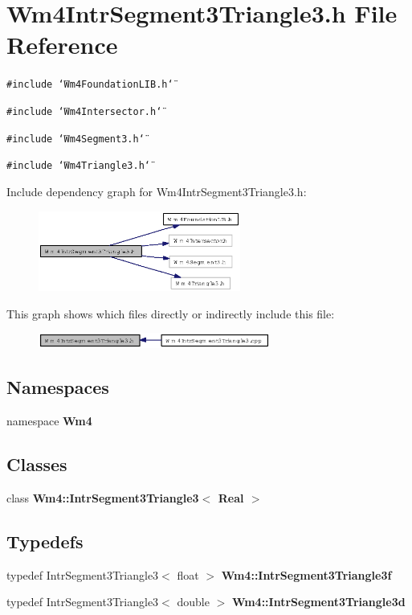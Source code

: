 \section{Wm4Intr\-Segment3Triangle3.h File Reference}
\label{Wm4IntrSegment3Triangle3_8h}
{\tt \#include \char`\"{}Wm4Foundation\-LIB.h\char`\"{}}\par
{\tt \#include \char`\"{}Wm4Intersector.h\char`\"{}}\par
{\tt \#include \char`\"{}Wm4Segment3.h\char`\"{}}\par
{\tt \#include \char`\"{}Wm4Triangle3.h\char`\"{}}\par


Include dependency graph for Wm4Intr\-Segment3Triangle3.h:\begin{figure}[H]
\begin{center}
\leavevmode
\includegraphics[width=188pt]{Wm4IntrSegment3Triangle3_8h__incl}
\end{center}
\end{figure}


This graph shows which files directly or indirectly include this file:\begin{figure}[H]
\begin{center}
\leavevmode
\includegraphics[width=216pt]{Wm4IntrSegment3Triangle3_8h__dep__incl}
\end{center}
\end{figure}
\subsection*{Namespaces}
\begin{CompactItemize}
\item 
namespace {\bf Wm4}
\end{CompactItemize}
\subsection*{Classes}
\begin{CompactItemize}
\item 
class {\bf Wm4::Intr\-Segment3Triangle3$<$ Real $>$}
\end{CompactItemize}
\subsection*{Typedefs}
\begin{CompactItemize}
\item 
typedef Intr\-Segment3Triangle3$<$ float $>$ {\bf Wm4::Intr\-Segment3Triangle3f}
\item 
typedef Intr\-Segment3Triangle3$<$ double $>$ {\bf Wm4::Intr\-Segment3Triangle3d}
\end{CompactItemize}

